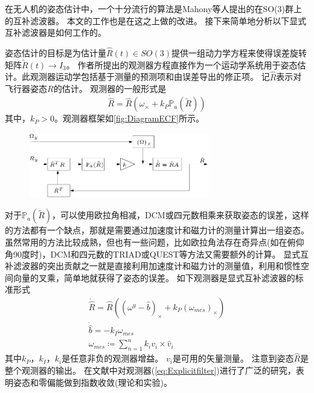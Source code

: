 \documentclass[
  type=master
]{gdutthesis}
\begin{document}
在无人机的姿态估计中，一个十分流行的算法是Mahony等人提出的在SO(3)群上的互补滤波器\cite{mahony2008nonlinear}。
本文的工作也是在这之上做的改进。
接下来简单地分析以下显式互补滤波器是如何工作的。

姿态估计的目标是为估计量$\hat{R}(t)\in SO(3)$提供一组动力学方程来使得误差旋转矩阵$\widetilde{R}(t)\rightarrow I_3$。
作者所提出的观测器方程直接作为一个运动学系统用于姿态估计。此观测器运动学包括基于测量的预测项和由误差导出的修正项。
记$\hat{R}$表示对飞行器姿态$R$的估计。
观测器的一般形式是
\begin{equation}\label{eq:passivefilter}
	\dot{\hat{R}}=\hat{R}(\omega_{\times}+k_P \mathbb{P}_a(\widetilde{R}))
\end{equation}
其中，$k_P>0$。观测器框架如\autoref{fig:DiagramECF}所示。
\begin{figure}[htbp]
	\centering
	\includegraphics[width=0.7\textwidth]{Block-diagram-of-the-simplified-form-of-the-passive-complementary-filter.png}
	\label{fig:DiagramECF}
\end{figure}
对于$\mathbb{P}_a(\widetilde{R})$，可以使用欧拉角相减，DCM或四元数相乘来获取姿态的误差，这样的方法都有一个缺点，那就是需要通过加速度计和磁力计的测量计算出一组姿态。
虽然常用的方法比较成熟，但也有一些问题，比如欧拉角法存在奇异点(如在俯仰角90度时)，DCM和四元数的TRIAD或QUEST等方法又需要额外的计算。
显式互补滤波器的突出贡献之一就是直接利用加速度计和磁力计的测量值，利用和惯性空间向量的叉乘，简单地就获得了姿态的误差。
如下观测器是\vspace{1ex}显式互补滤波器的标准形式
\begin{gather}\label{eq:Explicitfilter}
		\dot{\hat{R}} =\hat{R}((\omega^y - \hat{b})_{\times}+k_P (\omega_{mes})_{\times})\\
		\dot{\hat{b}} =-k_I \omega_{mes}\\
		\omega_{mes} \coloneqq \sum_{n=1}^{n} k_i v_i \times \hat{v}_i	
\end{gather}
其中$k_P$，$k_I$，$k_i$是任意非负的观测器增益。
$v_i$是可用的矢量测量。
注意到姿态$\hat{R}$是整个观测器的输出。
在文献\parencite{mahony2008nonlinear}中对观测器(\autoref{eq:Explicitfilter})进行了广泛的研究，表明姿态和零偏能做到指数收敛(理论和实验)。
\end{document}
